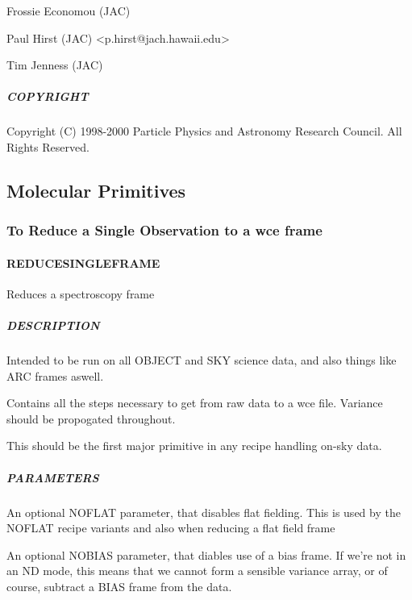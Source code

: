 \documentclass[twoside,11pt]{article}
\renewcommand{\_}{\texttt{\symbol{95}}}
\begin{document}
Frossie Economou (JAC)



Paul Hirst (JAC) <p.hirst@jach.hawaii.edu>



Tim Jenness (JAC)

\subparagraph*{COPYRIGHT\label{_NIGHT_LOG__COPYRIGHT}}

Copyright (C) 1998-2000 Particle Physics and Astronomy Research
Council.  All Rights Reserved.


\subsection{Molecular Primitives}

\subsubsection{To Reduce a Single Observation to a \_wce frame}

\paragraph*{\_REDUCE\_SINGLE\_FRAME\_\label{_REDUCE_SINGLE_FRAME_}}

Reduces a spectroscopy frame

\subparagraph*{DESCRIPTION\label{_REDUCE_SINGLE_FRAME__DESCRIPTION}}

Intended to be run on all OBJECT and SKY science data, and also things
like ARC frames aswell.



Contains all the steps necessary to get from raw data to a \_wce file.
Variance should be propogated throughout.



This should be the first major primitive in any recipe handling on-sky
data.

\subparagraph*{PARAMETERS\label{_REDUCE_SINGLE_FRAME__PARAMETERS}}

An optional NOFLAT parameter, that disables flat fielding.
This is used by the \_NOFLAT recipe variants and also when
reducing a flat field frame



An optional NOBIAS parameter, that diables use of a bias frame.
If we're not in an ND mode, this means that we cannot form a sensible
variance array, or of course, subtract a BIAS frame from the data.
\end{document}
